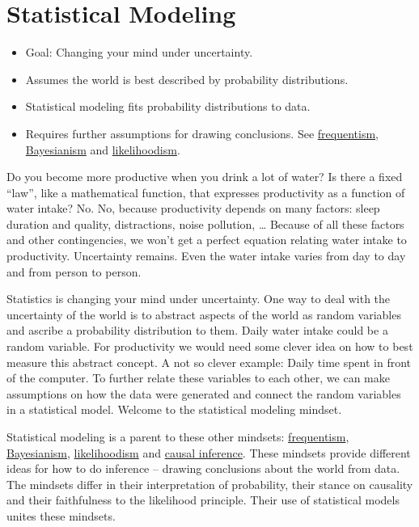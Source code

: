 \documentclass[
  10pt,
]{scrbook}
\providecommand{\tightlist}{%
  \setlength{\itemsep}{0pt}\setlength{\parskip}{0pt}}
\begin{document}
\hypertarget{statistical-modeling}{%
\chapter{Statistical Modeling}\label{statistical-modeling}}

\begin{itemize}
\tightlist
\item
  Goal: Changing your mind under uncertainty.
\item
  Assumes the world is best described by probability distributions.
\item
  Statistical modeling fits probability distributions to data.
\item
  Requires further assumptions for drawing conclusions. See \protect\hyperlink{frequentism}{frequentism}, \protect\hyperlink{bayesian}{Bayesianism} and \protect\hyperlink{likelihoodism}{likelihoodism}.
\end{itemize}

Do you become more productive when you drink a lot of water?
Is there a fixed ``law'', like a mathematical function, that expresses productivity as a function of water intake?
No.
No, because productivity depends on many factors: sleep duration and quality, distractions, noise pollution, \ldots{}
Because of all these factors and other contingencies, we won't get a perfect equation relating water intake to productivity.
Uncertainty remains.
Even the water intake varies from day to day and from person to person.

Statistics is changing your mind under uncertainty.
One way to deal with the uncertainty of the world is to abstract aspects of the world as random variables and ascribe a probability distribution to them.
Daily water intake could be a random variable.
For productivity we would need some clever idea on how to best measure this abstract concept.
A not so clever example: Daily time spent in front of the computer.
To further relate these variables to each other, we can make assumptions on how the data were generated and connect the random variables in a statistical model.
Welcome to the statistical modeling mindset.

Statistical modeling is a parent to these other mindsets: \protect\hyperlink{frequentism}{frequentism}, \protect\hyperlink{bayesianism}{Bayesianism}, \protect\hyperlink{likelihoodism}{likelihoodism} and \protect\hyperlink{causality}{causal inference}.
These mindsets provide different ideas for how to do inference -- drawing conclusions about the world from data.
The mindsets differ in their interpretation of probability, their stance on causality and their faithfulness to the likelihood principle.
Their use of statistical models unites these mindsets.
\end{document}
